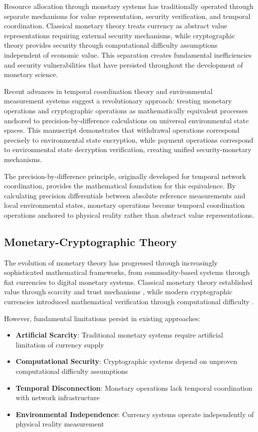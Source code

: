 \documentclass[12pt,a4paper]{article}
\begin{document}
Resource allocation through monetary systems has traditionally operated through separate mechanisms for value representation, security verification, and temporal coordination. Classical monetary theory treats currency as abstract value representations requiring external security mechanisms, while cryptographic theory provides security through computational difficulty assumptions independent of economic value. This separation creates fundamental inefficiencies and security vulnerabilities that have persisted throughout the development of monetary science.

Recent advances in temporal coordination theory and environmental measurement systems suggest a revolutionary approach: treating monetary operations and cryptographic operations as mathematically equivalent processes anchored to precision-by-difference calculations on universal environmental state spaces. This manuscript demonstrates that withdrawal operations correspond precisely to environmental state encryption, while payment operations correspond to environmental state decryption verification, creating unified security-monetary mechanisms.

The precision-by-difference principle, originally developed for temporal network coordination, provides the mathematical foundation for this equivalence. By calculating precision differentials between absolute reference measurements and local environmental states, monetary operations become temporal coordination operations anchored to physical reality rather than abstract value representations.

\subsection{Monetary-Cryptographic Theory}

The evolution of monetary theory has progressed through increasingly sophisticated mathematical frameworks, from commodity-based systems through fiat currencies to digital monetary systems. Classical monetary theory established value through scarcity and trust mechanisms \cite{menger1871,mises1912}, while modern cryptographic currencies introduced mathematical verification through computational difficulty \cite{chaum1983,nakamoto2008}.

However, fundamental limitations persist in existing approaches:

\begin{itemize}
\item \textbf{Artificial Scarcity}: Traditional monetary systems require artificial limitation of currency supply
\item \textbf{Computational Security}: Cryptographic systems depend on unproven computational difficulty assumptions
\item \textbf{Temporal Disconnection}: Monetary operations lack temporal coordination with network infrastructure
\item \textbf{Environmental Independence}: Currency systems operate independently of physical reality measurement
\end{itemize}
\end{document}
